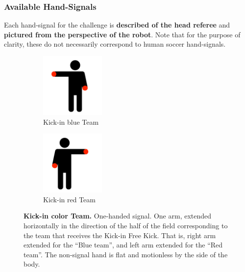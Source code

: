     \subsubsection{Available Hand-Signals}

        Each hand-signal for the challenge is \textbf{described of the head referee} and \textbf{pictured from the perspective of the robot}. Note that for the purpose of clarity, these do not necessarily correspond to human soccer hand-signals.

        \begin{figure}[ht!]
            \centering
            \begin{subfigure}{.33\textwidth}
                \centering
                \includegraphics[height=120px]{figs/referee-signals/kick-in.png}
                \caption{\color{blue}Kick-in \textlangle{}blue\textrangle{} Team}
            \end{subfigure}
            \begin{subfigure}{.33\textwidth}
                \centering
                \includegraphics[height=120px]{figs/referee-signals/kick-in-flipped.png}
                \caption{\color{red}Kick-in \textlangle{}red\textrangle{} Team}
            \end{subfigure}
            \caption{\textbf{Kick-in \textlangle{}color\textrangle{} Team.} One-handed signal. One arm, extended horizontally in the direction of the half of the field corresponding to the team that receives the Kick-in Free Kick. That is, right arm extended for the ``Blue team'', and left arm extended for the ``Red team''. The non-signal hand is flat and motionless by the side of the body.}
        \end{figure}
            
